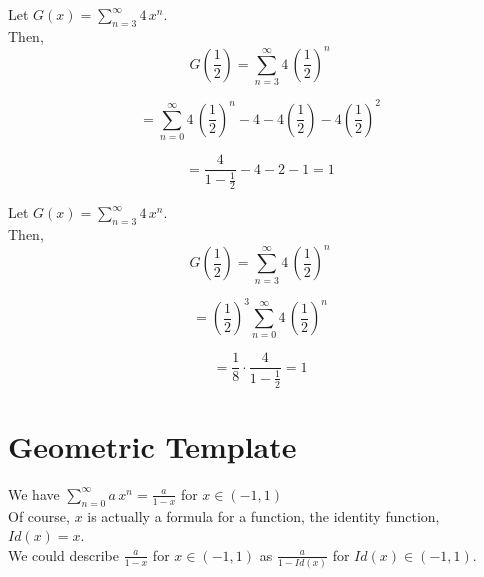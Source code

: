 \documentclass{ximera}
\begin{document}
\begin{example}


Let $G(x) = \sum\limits_{n=3}^{\infty} 4 \, x^n$. \\ 



Then, 
\[ G\left( \frac{1}{2} \right) = \sum\limits_{n=3}^{\infty} 4 \, \left( \frac {1}{2} \right)^n \]


\[ = \sum\limits_{n=0}^{\infty} 4 \, \left( \frac {1}{2} \right)^n  - 4 - 4 \left( \frac{1}{2} \right)  - 4 \left( \frac{1}{2} \right)^2    \]



\[
= \frac{4}{1-\frac{1}{2}} - 4 - 2 - 1 = 1
\]


\end{example}








\begin{example}


Let $G(x) = \sum\limits_{n=3}^{\infty} 4 \, x^n$. \\ 



Then, 
\[ G\left( \frac{1}{2} \right) = \sum\limits_{n=3}^{\infty} 4 \, \left( \frac {1}{2} \right)^n \]


\[ = \left( \frac{1}{2} \right)^3 \sum\limits_{n=0}^{\infty} 4 \, \left( \frac {1}{2} \right)^n \]

\[ =  \frac{1}{8} \cdot  \frac{4}{1-\frac{1}{2}} = 1 \]

\end{example}












\section*{Geometric Template}


We have $\sum\limits_{n=0}^{\infty} a \, x^n = \frac{a}{1-x}$ for $x \in (-1, 1)$ \\

Of course, $x$ is actually a formula for a function, the identity function, $Id(x) = x$. \\


We could describe $\frac{a}{1-x}$ for $x \in (-1, 1)$ as $\frac{a}{1-Id(x)}$ for $Id(x) \in (-1, 1)$.
\end{document}
